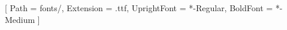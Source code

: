 \setlength{\parindent}{0cm} 								%
\setlength{\multicolsep}{6.0pt plus 2.0pt minus 1.5pt}	%
\setlength\tabcolsep{0pt} 								%



\setsansfont{AptiferSansPro}[
	Path = fonts/,
	Extension = .ttf,
    UprightFont = *-Regular,
    BoldFont = *-Medium
]



\titleformat{\section}{\large\sffamily}{\titlebar}{0.1cm}{}
\titleformat{\subsection}{\large\sffamily}{\titlebar}{0.1cm}{}
\titleformat{\subsubsection}{\large\sffamily}{\exercisebar}{0.1cm}{}



\renewcommand*{\thesection}{\arabic{section}}
\renewcommand*{\thesubsection}{\arabic{subsection}}
\renewcommand*{\thesubsubsection}{\Alph{subsubsection}}
\newcommand\getcurrentref[1]{%
 \ifnumequal{\value{#1}}{0}
  {??}
  {\the\value{#1}}%
}
\newcommand{\exercise}{\subsubsection}



\newcommand\YUGE{\fontsize{35}{35}\selectfont}

